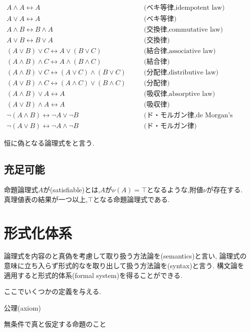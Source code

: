 \begin{align}
 A \land A \leftrightarrow A & \quad & \text{(ベキ等律,idempotent law)} \\
 A \lor A \leftrightarrow A & \quad & \text{(ベキ等律)} \\
 A \land B \leftrightarrow B \land A & \quad & \text{(交換律,commutative law)} \\
 A \lor B \leftrightarrow B \lor A & \quad & \text{(交換律)} \\
 (A \lor B) \lor C \leftrightarrow A \lor (B \lor C) & \quad & \text{(結合律,associative law)} \\
 (A \land B) \land C \leftrightarrow A \land (B \land C) & \quad & \text{(結合律)} \\
 (A \land B) \lor C \leftrightarrow (A \lor C) \land (B \lor C) & \quad & \text{(分配律,distributive law)} \\
 (A \lor B) \land C \leftrightarrow (A \land C) \lor (B \land C) & \quad & \text{(分配律)} \\
 (A \land B) \lor A \leftrightarrow A & \quad & \text{(吸収律,absorptive law)} \\
 (A \lor B) \land A \leftrightarrow A & \quad & \text{(吸収律)} \\
 \lnot (A \land B) \leftrightarrow \lnot A \lor \lnot B & \quad & \text{(ド・モルガン律,de Morgan's law)} \\
 \lnot (A \lor B) \leftrightarrow \lnot A \land \lnot B & \quad & \text{(ド・モルガン律)}
\end{align}

恒に偽となる論理式をと言う.

\subsection{充足可能}
命題論理式$A$が(satisfiable)とは,$A$が$\nu(A)=\top$となるような,附値$\nu$が存在する.
真理値表の結果が一つ以上,$\top$となる命題論理式である.

\section{形式化体系}
論理式を内容のと真偽を考慮して取り扱う方法論を(semantics)と言い,
論理式の意味に立ち入らず形式的なを取り出して扱う方法論を(syntax)と言う.
構文論を適用すると形式的体系(formal system)を得ることができる.

ここでいくつかの定義を与える.
\begin{dfn}
 公理(axiom)

 無条件で真と仮定する命題のこと
\end{dfn}

